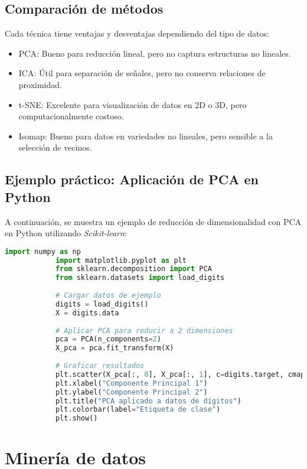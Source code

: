 \begin{itemize}
		\subsection{Comparación de métodos}
		
		Cada técnica tiene ventajas y desventajas dependiendo del tipo de datos:
		
		\begin{itemize}
			\item PCA: Bueno para reducción lineal, pero no captura estructuras no lineales.
			\item ICA: Útil para separación de señales, pero no conserva relaciones de proximidad.
			\item t-SNE: Excelente para visualización de datos en 2D o 3D, pero computacionalmente costoso.
			\item Isomap: Bueno para datos en variedades no lineales, pero sensible a la selección de vecinos.
		\end{itemize}
		
		\subsection{Ejemplo práctico: Aplicación de PCA en Python}
		
		A continuación, se muestra un ejemplo de reducción de dimensionalidad con PCA en Python utilizando \textit{Scikit-learn}:
		
		\begin{lstlisting}[language=Python, caption={Reducción de dimensionalidad con PCA en Python}]
			import numpy as np
			import matplotlib.pyplot as plt
			from sklearn.decomposition import PCA
			from sklearn.datasets import load_digits
			
			# Cargar datos de ejemplo
			digits = load_digits()
			X = digits.data
			
			# Aplicar PCA para reducir a 2 dimensiones
			pca = PCA(n_components=2)
			X_pca = pca.fit_transform(X)
			
			# Graficar resultados
			plt.scatter(X_pca[:, 0], X_pca[:, 1], c=digits.target, cmap='viridis', alpha=0.7)
			plt.xlabel("Componente Principal 1")
			plt.ylabel("Componente Principal 2")
			plt.title("PCA aplicado a datos de dígitos")
			plt.colorbar(label="Etiqueta de clase")
			plt.show()
		\end{lstlisting}
		\section{Minería de datos}
		

\end{itemize}
